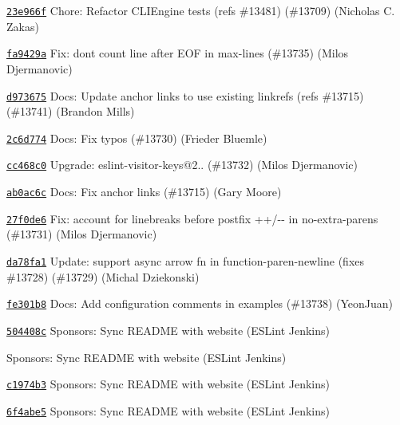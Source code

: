 \begin{DoxyItemize}
\item \href{https://github.com/eslint/eslint/commit/23e966f6cf2a6c6b699dff5d6950ece3cc396498}{\texttt{ {\ttfamily 23e966f}}} Chore\+: Refactor CLIEngine tests (refs \#13481) (\#13709) (Nicholas C. Zakas)
\item \href{https://github.com/eslint/eslint/commit/fa9429aac0ffed505f3f02e8fc75f646c69f5c61}{\texttt{ {\ttfamily fa9429a}}} Fix\+: don\textquotesingle{}t count line after EOF in max-\/lines (\#13735) (Milos Djermanovic)
\item \href{https://github.com/eslint/eslint/commit/d973675a5c06a2bd4f8ce640c78b67842cfebfd4}{\texttt{ {\ttfamily d973675}}} Docs\+: Update anchor links to use existing linkrefs (refs \#13715) (\#13741) (Brandon Mills)
\item \href{https://github.com/eslint/eslint/commit/2c6d774c89dcd14f386bd9d73d451fa2a892c3ef}{\texttt{ {\ttfamily 2c6d774}}} Docs\+: Fix typos (\#13730) (Frieder Bluemle)
\item \href{https://github.com/eslint/eslint/commit/cc468c01021385a028de727eefcd442e7f34875c}{\texttt{ {\ttfamily cc468c0}}} Upgrade\+: eslint-\/visitor-\/keys@2.. (\#13732) (Milos Djermanovic)
\item \href{https://github.com/eslint/eslint/commit/ab0ac6c532fb7b7d49779c8913146244d680743b}{\texttt{ {\ttfamily ab0ac6c}}} Docs\+: Fix anchor links (\#13715) (Gary Moore)
\item \href{https://github.com/eslint/eslint/commit/27f0de62e6281c28043be38ef051818c9edc15cd}{\texttt{ {\ttfamily 27f0de6}}} Fix\+: account for linebreaks before postfix {\ttfamily ++}/{\ttfamily -\/-\/} in no-\/extra-\/parens (\#13731) (Milos Djermanovic)
\item \href{https://github.com/eslint/eslint/commit/da78fa11632a2908db4ac494012a16f5d5a88a64}{\texttt{ {\ttfamily da78fa1}}} Update\+: support async arrow fn in function-\/paren-\/newline (fixes \#13728) (\#13729) (Michal Dziekonski)
\item \href{https://github.com/eslint/eslint/commit/fe301b8cc0762d7f4edd59603ca51ed0ec0c2a43}{\texttt{ {\ttfamily fe301b8}}} Docs\+: Add configuration comments in examples (\#13738) (Yeon\+Juan)
\item \href{https://github.com/eslint/eslint/commit/504408cd65e9d8827b2b8bbeb8f589df90eee523}{\texttt{ {\ttfamily 504408c}}} Sponsors\+: Sync README with website (ESLint Jenkins)
\item \href{https://github.com/eslint/eslint/commit/390065985b2289ad4412a83598e3e833c382d27e}{\texttt{ {}}} Sponsors\+: Sync README with website (ESLint Jenkins)
\item \href{https://github.com/eslint/eslint/commit/c1974b3f7169a8e5fab7007df92d02d8c1a8d5a3}{\texttt{ {\ttfamily c1974b3}}} Sponsors\+: Sync README with website (ESLint Jenkins)
\item \href{https://github.com/eslint/eslint/commit/6f4abe5d5ade2711cc4c21bc8485af952763c2d3}{\texttt{ {\ttfamily 6f4abe5}}} Sponsors\+: Sync README with website (ESLint Jenkins)
\end{DoxyItemize}

